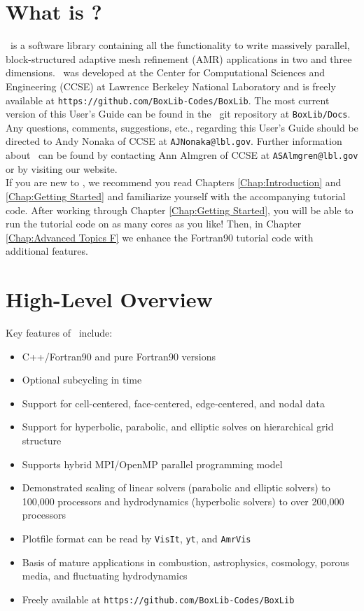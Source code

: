 \section{What is \BoxLib?}

\BoxLib\ is a software library containing all the functionality to write massively parallel, 
block-structured adaptive mesh refinement (AMR) applications in two and three dimensions.
\BoxLib\ was developed at the Center for Computational Sciences and Engineering (CCSE) at 
Lawrence Berkeley National Laboratory and is freely available
at {\tt https://github.com/BoxLib-Codes/BoxLib}.  The most current version of this User's Guide
can be found in the \BoxLib\ git repository at {\tt BoxLib/Docs}.  Any questions,
comments, suggestions, etc., regarding this User's Guide should be directed
to Andy Nonaka of CCSE at {\tt AJNonaka@lbl.gov}.  Further information 
about \BoxLib\ can be found by contacting Ann Almgren of CCSE at 
{\tt ASAlmgren@lbl.gov} or by visiting our website.\\

If you are new to \BoxLib, we recommend you read Chapters \ref{Chap:Introduction} and
\ref{Chap:Getting Started} and familiarize yourself with the accompanying tutorial code.
After working through Chapter \ref{Chap:Getting Started}, you will be able to run the tutorial
code on as many cores as you like!  Then, in Chapter \ref{Chap:Advanced Topics F} we enhance 
the Fortran90 tutorial code with additional features.

\section{High-Level Overview}

Key features of \BoxLib\ include:
\begin{itemize}
\item C++/Fortran90 and pure Fortran90 versions
\item Optional subcycling in time 
\item Support for cell-centered, face-centered, edge-centered, and nodal data
\item Support for hyperbolic, parabolic, and elliptic solves on hierarchical grid structure
\item Supports hybrid MPI/OpenMP parallel programming model
\item Demonstrated scaling of linear solvers (parabolic and elliptic solvers) to 100,000 processors and 
      hydrodynamics (hyperbolic solvers) to over 200,000 processors
\item Plotfile format can be read by {\tt VisIt}, {\tt yt}, and {\tt AmrVis}
\item Basis of mature applications in combustion, astrophysics, cosmology, porous media, and fluctuating hydrodynamics
\item Freely available at {\tt https://github.com/BoxLib-Codes/BoxLib}
\end{itemize}


